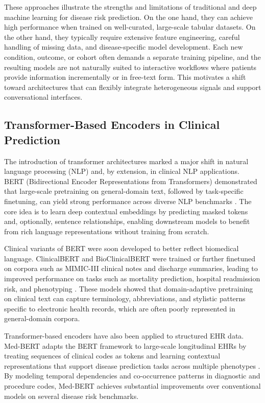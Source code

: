 These approaches illustrate the strengths and limitations of traditional and deep machine learning for disease risk prediction. On the one hand, they can achieve high performance when trained on well-curated, large-scale tabular datasets. On the other hand, they typically require extensive feature engineering, careful handling of missing data, and disease-specific model development. Each new condition, outcome, or cohort often demands a separate training pipeline, and the resulting models are not naturally suited to interactive workflows where patients provide information incrementally or in free-text form. This motivates a shift toward architectures that can flexibly integrate heterogeneous signals and support conversational interfaces.

\subsection{Transformer-Based Encoders in Clinical Prediction}

The introduction of transformer architectures marked a major shift in natural language processing (NLP) and, by extension, in clinical NLP applications. BERT (Bidirectional Encoder Representations from Transformers) demonstrated that large-scale pretraining on general-domain text, followed by task-specific finetuning, can yield strong performance across diverse NLP benchmarks \cite{devlin2019bert}. The core idea is to learn deep contextual embeddings by predicting masked tokens and, optionally, sentence relationships, enabling downstream models to benefit from rich language representations without training from scratch.

Clinical variants of BERT were soon developed to better reflect biomedical language. ClinicalBERT and BioClinicalBERT were trained or further finetuned on corpora such as MIMIC-III clinical notes and discharge summaries, leading to improved performance on tasks such as mortality prediction, hospital readmission risk, and phenotyping \cite{huang2019clinicalbert,alsentzer2019publicly}. These models showed that domain-adaptive pretraining on clinical text can capture terminology, abbreviations, and stylistic patterns specific to electronic health records, which are often poorly represented in general-domain corpora.

Transformer-based encoders have also been applied to structured EHR data. Med-BERT adapts the BERT framework to large-scale longitudinal EHRs by treating sequences of clinical codes as tokens and learning contextual representations that support disease prediction tasks across multiple phenotypes \cite{rasmy2021medbert}. By modeling temporal dependencies and co-occurrence patterns in diagnostic and procedure codes, Med-BERT achieves substantial improvements over conventional models on several disease risk benchmarks.

